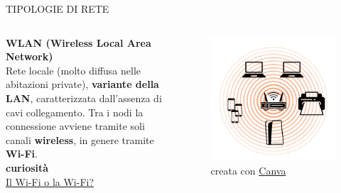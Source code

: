 \documentclass[aspectratio=1610]{beamer}
\begin{document}
\begin{frame}{TIPOLOGIE DI RETE}
    \begin{columns}
            \justifying
            \textbf{WLAN (Wireless Local Area Network)} \\
            Rete locale (molto diffusa nelle abitazioni private), \textbf{variante della LAN}, caratterizzata 
            dall'assenza di cavi collegamento. Tra i nodi la connessione avviene tramite soli canali \textbf{wireless},
            in genere tramite \textbf{Wi-Fi}.\\
            \bigskip
            \tiny{\textbf{curiosità}}\\
            \href{https://accademiadellacrusca.it/it/consulenza/il-wifi-o-la-wifi-limportante-alla-fine-\%C3\%A8-che-funzioni/1247}{Il Wi-Fi o la Wi-Fi?}
            \begin{figure}
                \includegraphics[width=\linewidth]{img/wlan.png}
                \caption{{creata con \href{https://www.canva.com/}{Canva}}}
            \end{figure}
    \end{columns}
\end{frame}
\end{document}
